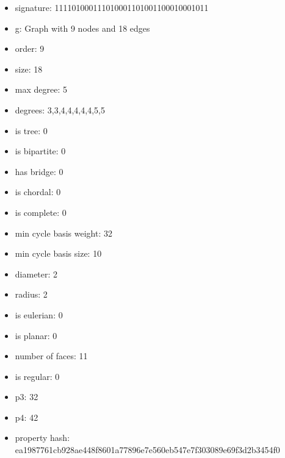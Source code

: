 \newpage
\begin{figure}
\end{figure}
\begin{itemize}
\item signature: 111101000111010001101001100010001011
\item g: Graph with 9 nodes and 18 edges
\item order: 9
\item size: 18
\item max degree: 5
\item degrees: 3,3,4,4,4,4,4,5,5
\item is tree: 0
\item is bipartite: 0
\item has bridge: 0
\item is chordal: 0
\item is complete: 0
\item min cycle basis weight: 32
\item min cycle basis size: 10
\item diameter: 2
\item radius: 2
\item is eulerian: 0
\item is planar: 0
\item number of faces: 11
\item is regular: 0
\item p3: 32
\item p4: 42
\item property hash: ea1987761cb928ae448f8601a77896e7e560eb547e7f303089e69f3d2b3454f0
\end{itemize}
